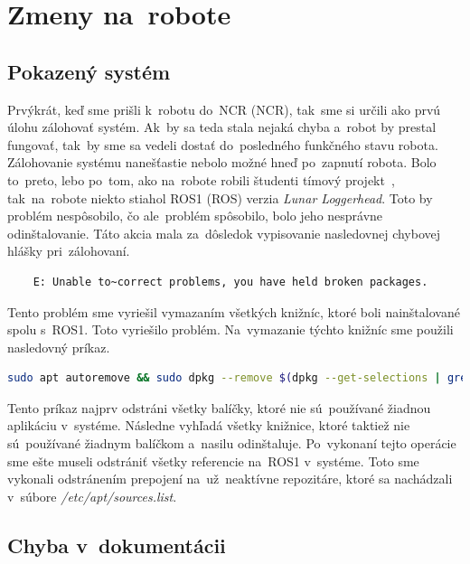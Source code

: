 
\section{Zmeny na~robote}

\subsection{Pokazený systém}
\label{subsec:brokenSystem}

Prvýkrát, keď sme prišli k~robotu do~NCR (\acrlong{NCR}), tak~sme si určili ako prvú úlohu zálohovať systém. Ak~by sa teda stala nejaká chyba
a~robot by prestal fungovať, tak~by sme sa vedeli dostať do~posledného funkčného stavu robota. Zálohovanie systému nanešťastie nebolo možné
hneď po~zapnutí robota. Bolo to~preto, lebo po~tom, ako na~robote robili študenti tímový projekt~\cite{timovyProjekt}, tak~na~robote niekto
stiahol ROS1 (\acrlong{ROS}) verzia \textit{Lunar Loggerhead}. Toto by problém nespôsobilo, čo ale~problém spôsobilo, bolo jeho nesprávne odinštalovanie.
Táto akcia mala za~dôsledok vypisovanie nasledovnej chybovej hlášky pri~zálohovaní.

\begin{lstlisting}
	E: Unable to~correct problems, you have held broken packages.
\end{lstlisting}

Tento problém sme vyriešil vymazaním všetkých knižníc, ktoré boli nainštalované spolu s~ROS1. Toto vyriešilo problém. Na~vymazanie týchto
knižníc sme použili nasledovný príkaz.

\begin{lstlisting}[language=bash]
	sudo apt autoremove && sudo dpkg --remove $(dpkg --get-selections | grep hold)
\end{lstlisting}

Tento príkaz najprv odstráni všetky balíčky, ktoré nie sú~používané žiadnou aplikáciu v~systéme. Následne vyhľadá všetky knižnice,
ktoré taktiež nie sú~používané žiadnym balíčkom a~nasilu odinštaluje. Po~vykonaní tejto operácie sme ešte museli odstrániť všetky referencie
na~ROS1 v~systéme. Toto sme vykonali odstránením prepojení na~už~neaktívne repozitáre, ktoré sa nachádzali v~súbore \textit{/etc/apt/sources.list}.

\subsection{Chyba v~dokumentácii}
\label{subsec:documentationIssue}

